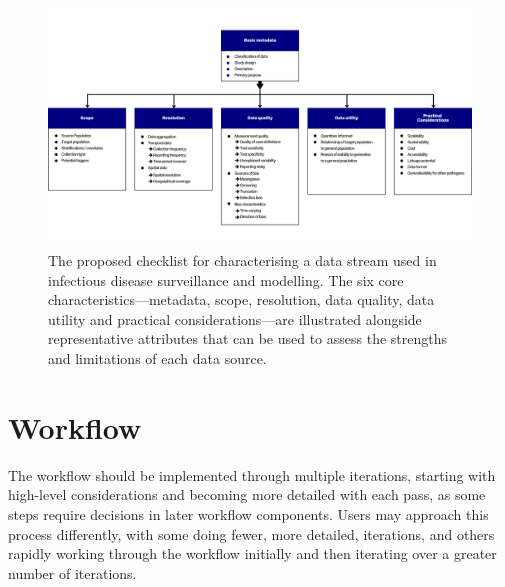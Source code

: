 \documentclass{article}
\begin{document}
\begin{figure}[H] 
\includegraphics[width=1\linewidth]{figures/Abbott et al figure 1.png}
\centering
\caption{The proposed checklist for characterising a data stream used in infectious disease surveillance and modelling. The six core characteristics---metadata, scope, resolution, data quality, data utility and practical considerations---are illustrated alongside representative attributes that can be used to assess the strengths and limitations of each data source. }
\label{data_characteristics}
\end{figure}


\section{Workflow}
\label{sec:workflow}

The workflow should be implemented through multiple iterations, starting with high-level considerations and becoming more detailed with each pass, as some steps require decisions in later workflow components. Users may approach this process differently, with some doing fewer, more detailed, iterations, and others rapidly working through the workflow initially and then iterating over a greater number of iterations.
\end{document}
